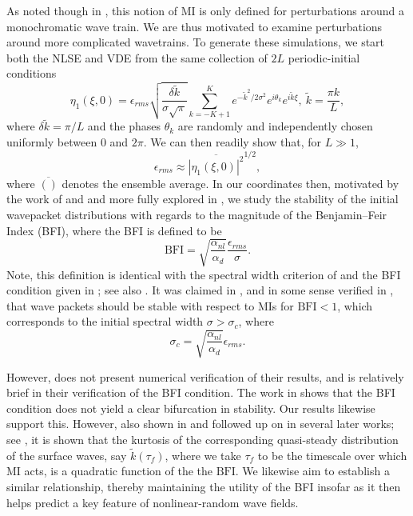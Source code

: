 \documentclass[a4paper,11pt]{article}
\begin{document}
As noted though in \cite{alber}, this notion of MI is only defined for perturbations around a monochromatic wave train.  We are thus motivated to examine perturbations around more complicated wavetrains.  To generate these simulations, we start both the NLSE and VDE from the same collection of $2L$ periodic-initial conditions
\[
\eta_{1}(\xi,0) = \epsilon_{rms}\sqrt{\frac{\delta \tilde{k}}{\sigma\sqrt{\pi}}} \sum_{k=-K+1}^{K}e^{-\tilde{k}^{2}/2\sigma^{2}}e^{i\theta_{k}}e^{i\tilde{k}\xi}, ~ \tilde{k} = \frac{\pi k}{L},
\]
where $\delta \tilde{k}=\pi/L$ and the phases $\theta_{k}$ are randomly and independently chosen uniformly between $0$ and $2\pi$.  We can then readily show that, for $L\gg 1$, 
\[
\epsilon_{rms} \approx \overline{\left|\eta_{1}(\xi,0)\right|^{2}}^{1/2},
\]
where $\overline{()}$ denotes the ensemble average.  In our coordinates then, motivated by the work of \cite{alber} and \cite{dysthe2} and more fully explored in \cite{janssen}, we study the stability of the initial wavepacket distributions with regards to the magnitude of the Benjamin--Feir Index (BFI), where the BFI is defined to be  
\[
\mbox{BFI} = \sqrt{\frac{\alpha_{nl}}{\alpha_{d}}}\frac{\epsilon_{rms}}{\sigma}.
\]
Note, this definition is identical with the spectral width criterion of \cite{alber} and the BFI condition given in \cite{thomas2012nonlinear}; see also \cite{onorato}.  It was claimed in \cite{alber}, and in some sense verified in \cite{dysthe2}, that wave packets should be stable with respect to MIs for $\mbox{BFI}<1$, which corresponds to the initial spectral width $\sigma>\sigma_{c}$, where 
\[
\sigma_{c} = \sqrt{\frac{\alpha_{nl}}{\alpha_{d}}}\epsilon_{rms}.
\]

However, \cite{alber} does not present numerical verification of their results, and \cite{dysthe2} is relatively brief in their verification of the BFI condition.  The work in \cite{janssen} shows that the BFI condition does not yield a clear bifurcation in stability.  Our results likewise support this.  However, also shown in \cite{janssen} and followed up on in several later works; see \cite{onorato,slunyaev,eeltink}, it is shown that the kurtosis of the corresponding quasi-steady distribution of the surface waves, say $\tilde{k}(\tau_{f})$, where we take $\tau_{f}$ to be the timescale over which MI acts, is a quadratic function of the the $\mbox{BFI}$.   We likewise aim to establish a similar relationship, thereby maintaining the utility of the BFI insofar as it then helps predict a key feature of nonlinear-random wave fields. 
\end{document}
